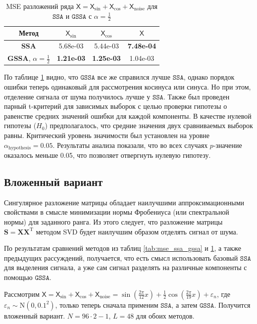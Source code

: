 \documentclass[12pt, specialist, subf
]{disser}
\theoremstyle{definition}
\newcommand{\SSA}{\texttt{SSA}}
\newcommand{\GSSA}{\texttt{GSSA}}
\newcommand{\TS}{\mathsf{X}}
\begin{document}
\begin{table}[H]
	\caption{MSE разложений ряда $\TS = \TS_{\sin} + \TS_{\cos} + \TS_{\mathrm{noise}}$ для $\SSA$ и $\GSSA$ с $\alpha = \frac{1}{2}$}
	\label{tab:errs_ssa_gssa}
	\centering
	\begin{tabular}{c|ccc}
		\hline
		Метод                                 & $\TS_{\sin}$      & $\TS_{\cos}$      & $\TS$             \\
		\hline
		\textbf{SSA}                          & 5.68e-03          & 5.44e-03          & \textbf{7.48e-04} \\
		\textbf{GSSA}, $\alpha = \frac{1}{2}$ & \textbf{1.21e-03} & \textbf{1.25e-03} & 1.04e-03          \\
		\hline
	\end{tabular}

\end{table}

По таблице \ref{tab:errs_ssa_gssa} видно, что $\GSSA$ все же справился лучше $\SSA$, однако порядок ошибки теперь одинаковый для рассмотрения косинуса или синуса. Но при этом, отделение сигнала от шума получилось лучше у $\SSA$.
Также был проведен парный t-критерий для зависимых выборок с целью проверки гипотезы о равенстве средних значений ошибки для каждой компоненты. В качестве нулевой гипотезы ($H_0$) предполагалось, что средние значения двух сравниваемых выборок равны. Критический уровень значимости был установлен на уровне $\alpha_{\mathrm{hypothesis}} = 0.05$.
Результаты анализа показали, что во всех случаях $p$-значение оказалось меньше 0.05, что позволяет отвергнуть нулевую гипотезу.

\subsection{Вложенный вариант}
Сингулярное разложение матрицы обладает наилучшими аппроксимационными свойствами в смысле минимизации нормы Фробениуса (или спектральной нормы) для заданного ранга. Из этого следует, что разложение матрицы $\mathbf{S} = \mathbf{X}\mathbf{X}^{\mathrm{T}}$ методом SVD будет наилучшим образом отделять сигнал от шума.

По результатам сравнений методов из таблиц \ref{tab:mse_ssa_gssa} и \ref{tab:errs_ssa_gssa}, а также предыдущих рассуждений, получается, что есть смысл использовать базовый $\SSA$ для выделения сигнала, а уже сам сигнал разделять на различные компоненты с помощью $\GSSA$.

Рассмотрим $\TS = \TS_{\sin} + \TS_{\cos} + \TS_{\mathrm{noise}} =
	\sin\left(\frac{2\pi}{12}x\right) +
	\frac{1}{2}\cos\left(\frac{2\pi}{19}x\right)+
	\varepsilon_n$,
где $\varepsilon_n \sim \mathrm N(0, 0.1^2)$, только теперь сначала применим $\SSA$, а затем $\GSSA$. Получится вложенный вариант.
$N = 96 \cdot 2 - 1$, $L = 48$ для обоих методов.
\end{document}
